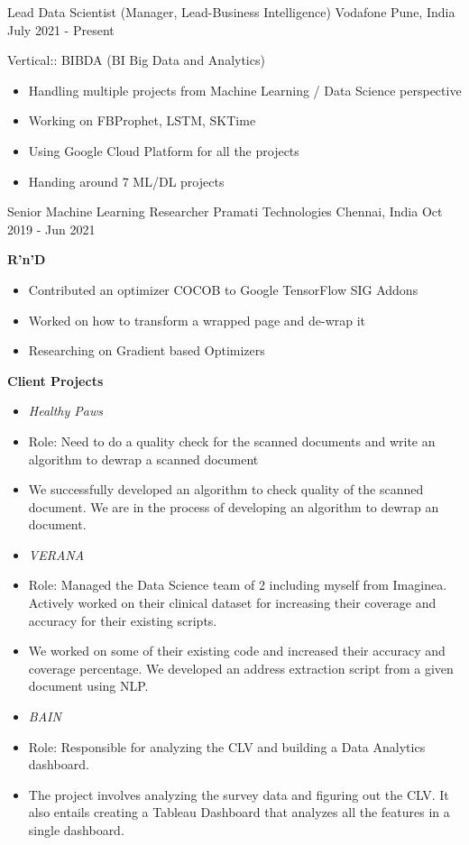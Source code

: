\begin{cventries}

	\cventry
	{Lead Data Scientist (Manager, Lead-Business Intelligence)}
	{Vodafone}
	{Pune, India}
	{July 2021 - Present}
	{
		\begin{justify}
			Vertical:: BIBDA (BI Big Data and Analytics)
			\begin{itemize}
				\item Handling multiple projects from Machine Learning / Data Science perspective
				\item Working on FBProphet, LSTM, SKTime
				\item Using Google Cloud Platform for all the projects
				\item Handing around 7 ML/DL projects
			\end{itemize}
		\end{justify}
	}

	\cventry
	{Senior Machine Learning Researcher}
	{Pramati Technologies}
	{Chennai, India}
	{Oct 2019 - Jun 2021}
	{
		\begin{justify}
			\textbf{R'n'D}
			\begin{itemize}
				\item Contributed an optimizer COCOB to Google TensorFlow SIG Addons 
				\item Worked on how to transform a wrapped page and de-wrap it 
				\item Researching on Gradient based Optimizers
			\end{itemize}
			\textbf{Client Projects}
			\begin{itemize}
				\item[] \textit{Healthy Paws}
				\item Role: Need to do a quality check for the scanned documents and write an algorithm to dewrap a scanned document
				\item We successfully developed an algorithm to check quality of the scanned document. We are in the process of developing an algorithm to dewrap an document.
				\item[] \textit{VERANA}
				\item Role: Managed the Data Science team of 2 including myself from Imaginea. Actively worked on their clinical dataset for increasing their coverage and accuracy for their existing scripts.
				\item We worked on some of their existing code and increased their accuracy and coverage percentage. We developed an address extraction script from a given document using NLP.
				\item[] \textit{BAIN}
				\item Role: Responsible for analyzing the CLV and building a Data Analytics dashboard.
				\item The project involves analyzing the survey data and figuring out the CLV. It also entails creating a Tableau Dashboard that analyzes all the features in a single dashboard.
			\end{itemize}
		\end{justify}
	}
	

\end{cventries}
